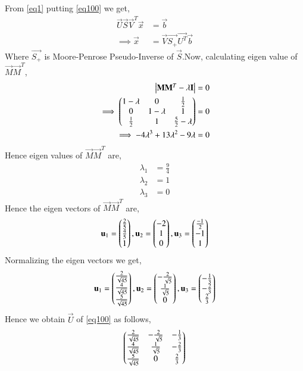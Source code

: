 \documentclass[journal,12pt,twocolumn]{IEEEtran}
\begin{document}
From \eqref{eq1} putting \eqref{eq100} we get,
\begin{align}\label{eqX}
\vec{U}\vec{S}\vec{V}^T\vec{x} & = \vec{b}\\
\implies\vec{x} &= \vec{V}\vec{S_+}\vec{U^T}\vec{b}
\end{align}
Where $\vec{S_+}$ is Moore-Penrose Pseudo-Inverse of $\vec{S}$.Now, calculating eigen value of $\vec{M}\vec{M}^T$,
\begin{align}
\begin{vmatrix}\mathbf{M}\mathbf{M}^T - \lambda\mathbf{I}\end{vmatrix} &= 0\\
\implies\begin{pmatrix}1-\lambda&0&\frac{1}{2}\\0&1-\lambda&1\\\frac{1}{2}&1&\frac{5}{2}-\lambda\end{pmatrix} &=0\\
\implies-4\lambda^3+13 \lambda^2-9\lambda &=0
\end{align}
Hence eigen values of $\vec{M}\vec{M}^T$ are,
\begin{align}
\lambda_1 &=\frac{9}{4}\\
\lambda_2 &= 1\\
\lambda_3 &=0
\end{align}
Hence the eigen vectors of $\vec{M}\vec{M}^T$ are,
\begin{align}
\mathbf{u}_1=\begin{pmatrix}\frac{2}{5}\\\frac{4}{5}\\1\end{pmatrix},
\mathbf{u}_2=\begin{pmatrix}-2\\1\\0\end{pmatrix},
\mathbf{u}_3=\begin{pmatrix}\frac{-1}{2}\\-1\\1\end{pmatrix}
\end{align}
Normalizing the eigen vectors we get,
\begin{align}
\mathbf{u}_1=\begin{pmatrix}\frac{2}{\sqrt{45}}\\\frac{4}{\sqrt{45}}\\\frac{5}{\sqrt{45}}\end{pmatrix},
\mathbf{u}_2=\begin{pmatrix}-\frac{2}{\sqrt{5}}\\\frac{1}{\sqrt{5}}\\0\end{pmatrix},
\mathbf{u}_3=\begin{pmatrix}-\frac{1}{3}\\-\frac{2}{3}\\\frac{2}{3}\end{pmatrix}
\end{align}
Hence we obtain $\vec{U}$ of \eqref{eq100} as follows,
\begin{align}\label{eqU}
\begin{pmatrix}\frac{2}{\sqrt{45}}& -\frac{2}{\sqrt{5}}&-\frac{1}{3}\\
\frac{4}{\sqrt{45}}&\frac{1}{\sqrt{5}}&-\frac{2}{3}\\
\frac{5}{\sqrt{45}}&0&\frac{2}{3}\end{pmatrix}
\end{align}
\end{document}
